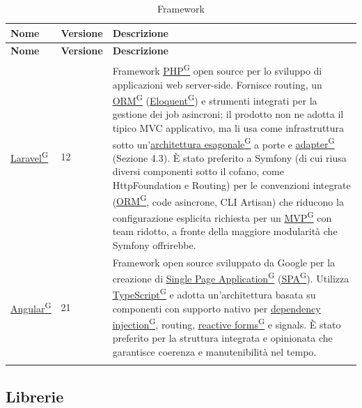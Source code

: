\documentclass[a4paper,12pt]{article}
\providecommand{\glslink}[2]{\href{https://alittlebyte-19.github.io/Documentazione/glossario.html\#gls-#1}{\underline{#2}\textsuperscript{\scriptsize G}}}
\begin{document}
\renewcommand{\arraystretch}{1.3}
{\small
\setlength{\LTleft}{0pt}
\setlength{\LTright}{0pt}
\begin{longtable}{|p{3cm}|p{1.8cm}|p{9.7cm}|}
    \hline
    \rowcolor{gray!20}
    \textbf{Nome} & \textbf{Versione} & \textbf{Descrizione} \\
    \hline
    \endfirsthead
    \hline
    \rowcolor{gray!20}
    \textbf{Nome} & \textbf{Versione} & \textbf{Descrizione} \\
    \hline
    \endhead
    \glslink{laravel}{Laravel} & 12 & Framework \glslink{php}{PHP} open source per lo sviluppo di applicazioni web server-side. Fornisce routing, un \glslink{orm-object-relational-mapping}{ORM} (\glslink{eloquent}{Eloquent}) e strumenti integrati per la gestione dei job asincroni; il prodotto non ne adotta il tipico MVC applicativo, ma li usa come infrastruttura sotto un'\glslink{architettura-esagonale}{architettura esagonale} a porte e \glslink{adapter}{adapter} (Sezione 4.3). È stato preferito a Symfony (di cui riusa diversi componenti sotto il cofano, come HttpFoundation e Routing) per le convenzioni integrate (\glslink{orm-object-relational-mapping}{ORM}, code asincrone, CLI Artisan) che riducono la configurazione esplicita richiesta per un \glslink{mvp-minimum-viable-product}{MVP} con team ridotto, a fronte della maggiore modularità che Symfony offrirebbe. \\
    \hline
    \glslink{angular}{Angular} & 21 & Framework open source sviluppato da Google per la creazione di \glslink{spa-single-page-application}{Single Page Application} (\glslink{spa-single-page-application}{SPA}). Utilizza \glslink{typescript}{TypeScript} e adotta un'architettura basata su componenti con supporto nativo per \glslink{dependency-injection}{dependency injection}, routing, \glslink{reactive-forms}{reactive forms} e signals. È stato preferito per la struttura integrata e opinionata che garantisce coerenza e manutenibilità nel tempo. \\
    \hline
    \caption{Framework}
\end{longtable}
}

\subsection{Librerie}
\end{document}
